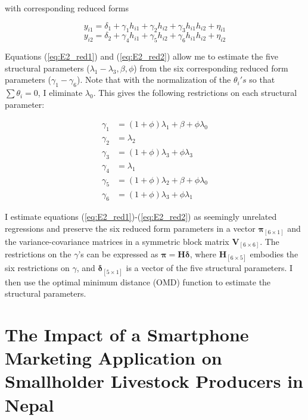 \documentclass[11pt]{article}
\begin{document}
with corresponding reduced forms

\begin{equation} \label{eq:E2_red1}
    y_{i1} = \delta_1 + \gamma_{1}h_{i1} + \gamma_{2}h_{i2} + \gamma_{3}h_{i1}h_{i2} + \eta_{i1}
\end{equation}
\begin{equation} \label{eq:E2_red2}
    y_{i2} = \delta_2 + \gamma_{4}h_{i1} + \gamma_{5}h_{i2} + \gamma_{6}h_{i1}h_{i2} + \eta_{i2}
\end{equation}

Equations (\ref{eq:E2_red1}) and (\ref{eq:E2_red2}) allow me to estimate the five structural parameters ($\lambda_1-\lambda_3,\beta,\phi$) from the six corresponding reduced form parameters ($\gamma_{1}-\gamma_{6}$). Note that with the normalization of the $\theta_{i}'s$ so that $\sum \theta_{i} = 0$, I eliminate $\lambda_0$. This gives the following restrictions on each structural parameter:

\begin{align*}
    \gamma_1 & = (1+\phi)\lambda_1 + \beta + \phi\lambda_0 \\
    \gamma_2 & = \lambda_2 \\
    \gamma_3 & = (1+\phi)\lambda_3 + \phi\lambda_3 \\
    \gamma_4 & = \lambda_1 \\
    \gamma_5 & = (1+\phi)\lambda_2 + \beta + \phi\lambda_0 \\
    \gamma_6 & = (1+\phi)\lambda_3 + \phi\lambda_1
\end{align*}

I estimate equations (\ref{eq:E2_red1})-(\ref{eq:E2_red2}) as seemingly unrelated regressions and preserve the six reduced form parameters in a vector $\boldsymbol{\pi}_{[6 \times 1]}$ and the variance-covariance matrices in a symmetric block matrix $\textbf{V}_{[6 \times 6]}$. The restrictions on the $\gamma$’s can be expressed as $\boldsymbol{\pi} = \textbf{H}\boldsymbol{\delta}$, where $\textbf{H}_{[6 \times 5]}$ embodies the six restrictions on $\gamma$, and $\boldsymbol{\delta}_{[5 \times 1]}$ is a vector of the five structural parameters. I then use the optimal minimum distance (OMD) function to estimate the structural parameters.%


\newpage
\singlespacing
\section{The Impact of a Smartphone Marketing Application on Smallholder Livestock Producers in Nepal} \label{sec:E3}
\doublespacing
\end{document}
